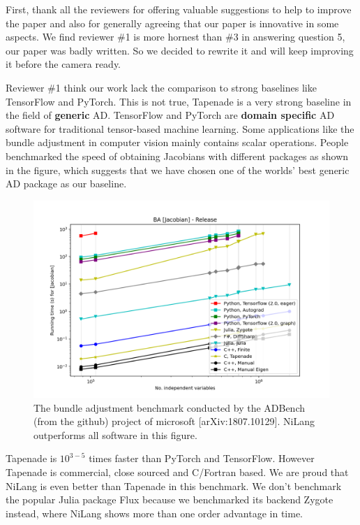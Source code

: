 \documentclass{article}
\begin{document}
First, thank all the reviewers for offering valuable suggestions to help to improve the paper and also for generally agreeing that our paper is innovative in some aspects.
We find reviewer \#1 is more hornest than \#3 in answering question 5, our paper was badly written.
So we decided to rewrite it and will keep improving it before the camera ready.

Reviewer \#1 think our work lack the comparison to strong baselines like TensorFlow and PyTorch.
This is not true, Tapenade is a very strong baseline in the field of \textbf{generic} AD.
TensorFlow and PyTorch are \textbf{domain specific} AD software for traditional tensor-based machine learning.
Some applications like the bundle adjustment in computer vision mainly contains scalar operations.
People benchmarked the speed of obtaining Jacobians with different packages as shown in the figure, which suggests that we have chosen one of the worlds' best generic AD package as our baseline.
\begin{figure}
    \centerline{\includegraphics[width=0.5\columnwidth,trim={0 1cm 1cm 1.7cm},clip]{ba-jacobian-adbench.png}}
    \caption{The bundle adjustment benchmark conducted by the ADBench (from the github) project of microsoft [arXiv:1807.10129]. NiLang outperforms all software in this figure.}\label{bench-ba}
\end{figure}
Tapenade is $10^{3-5}$ times faster than PyTorch and TensorFlow. However Tapenade is commercial, close sourced and C/Fortran based.
We are proud that NiLang is even better than Tapenade in this benchmark.
We don't benchmark the popular Julia package Flux because we benchmarked its backend Zygote instead, where NiLang shows more than one order advantage in time.
\end{document}

